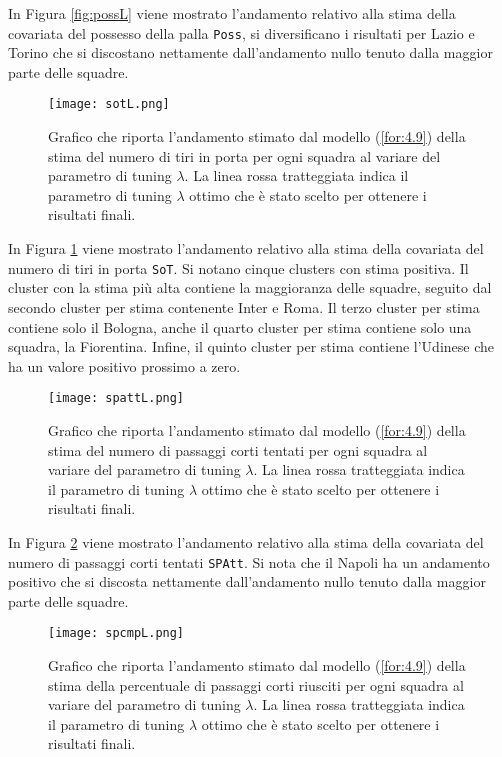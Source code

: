 In Figura \ref{fig:possL} viene mostrato l'andamento relativo alla stima della covariata del possesso della palla \texttt{Poss}, si diversificano i risultati per Lazio e Torino che si discostano nettamente dall'andamento nullo tenuto dalla maggior parte delle squadre.

\begin{figure}[htbp]
	\begin{center}
		\texttt{[image: sotL.png]}
		\caption{Grafico che riporta l'andamento stimato dal modello (\ref{for:4.9}) della stima del numero di tiri in porta per ogni squadra al variare del parametro di tuning $\lambda$. La linea rossa tratteggiata indica il parametro di tuning $\lambda$ ottimo che è stato scelto per ottenere i risultati finali.} \label{fig:sotL}
	\end{center}
\end{figure}

In Figura \ref{fig:sotL} viene mostrato l'andamento relativo alla stima della covariata del numero di tiri in porta \texttt{SoT}. Si notano cinque clusters con stima positiva. Il cluster con la stima più alta contiene la maggioranza delle squadre, seguito dal secondo cluster per stima contenente Inter e Roma. Il terzo cluster per stima contiene solo il Bologna, anche il quarto cluster per stima contiene solo una squadra, la Fiorentina. Infine, il quinto cluster per stima contiene l'Udinese che ha un valore positivo prossimo a zero.

\begin{figure}[htbp]
	\begin{center}
		\texttt{[image: spattL.png]}
		\caption{Grafico che riporta l'andamento stimato dal modello (\ref{for:4.9}) della stima del numero di passaggi corti tentati per ogni squadra al variare del parametro di tuning $\lambda$. La linea rossa tratteggiata indica il parametro di tuning $\lambda$ ottimo che è stato scelto per ottenere i risultati finali.} \label{fig:spattL}
	\end{center}
\end{figure}

In Figura \ref{fig:spattL} viene mostrato l'andamento relativo alla stima della covariata del numero di passaggi corti tentati \texttt{SPAtt}. Si nota che il Napoli ha un andamento positivo che si discosta nettamente dall'andamento nullo tenuto dalla maggior parte delle squadre.

\begin{figure}[htbp]
	\begin{center}
		\texttt{[image: spcmpL.png]}
		\caption{Grafico che riporta l'andamento stimato dal modello (\ref{for:4.9}) della stima della percentuale di passaggi corti riusciti per ogni squadra al variare del parametro di tuning $\lambda$. La linea rossa tratteggiata indica il parametro di tuning $\lambda$ ottimo che è stato scelto per ottenere i risultati finali.} \label{fig:spcmpL}
	\end{center}
\end{figure}

